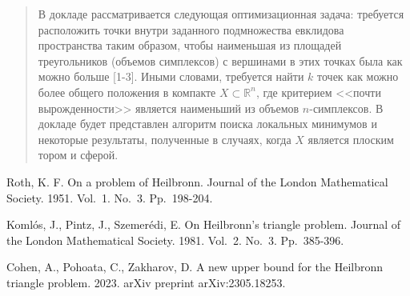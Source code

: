 \maketitle

\begin{abstract}
В докладе рассматривается следующая оптимизационная задача: требуется расположить точки внутри заданного подмножества евклидова пространства таким образом, чтобы наименьшая из площадей треугольников (объемов симплексов) с вершинами в этих точках была как можно больше [1-3]. Иными словами, требуется найти  $k$ точек как можно более общего положения в компакте $X \subset \mathbb{R}^n$, где критерием <<почти вырожденности>> является наименьший из объемов $n$-симплексов. В докладе будет представлен алгоритм поиска локальных минимумов и некоторые результаты, полученные в случаях, когда $X$ является плоским тором и сферой.
\end{abstract}


\begin{thebibliography}{99}
Roth, K. F.  On a problem of Heilbronn. Journal of the London Mathematical Society. 1951. Vol.~1. No.~3. Pp.~198-204.

Komlós, J., Pintz, J.,  Szemerédi, E.  On Heilbronn's triangle problem. Journal of the London Mathematical Society. 1981.  Vol.~2. No.~3. Pp.~385-396.

Cohen, A., Pohoata, C.,  Zakharov, D.  A new upper bound for the Heilbronn triangle problem. 2023. arXiv preprint arXiv:2305.18253.

\end{thebibliography}






%
